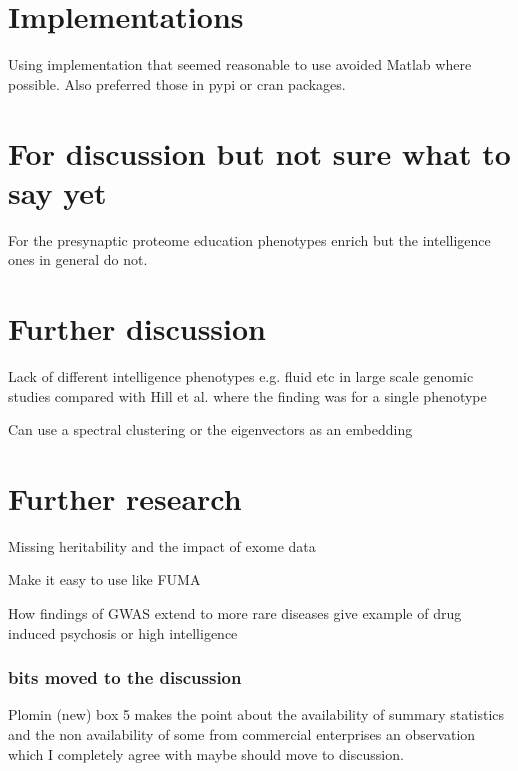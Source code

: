 \section{Implementations}

Using implementation that seemed reasonable to use avoided Matlab where possible. Also preferred those in pypi or cran packages. 


\section{For discussion but not sure what to say yet}

For the presynaptic proteome education phenotypes enrich but the intelligence ones in general do not. 

\section{Further discussion}
Lack of different intelligence phenotypes e.g. fluid etc in large scale genomic studies compared with Hill et al. where the finding was for a single phenotype

Can use a spectral clustering or the eigenvectors as an embedding
\section{Further research}
Missing heritability and the impact of exome data

Make it easy to use like FUMA

How findings of GWAS extend to more rare diseases give example of drug induced psychosis or high intelligence

\subsubsection{bits moved to the discussion}
Plomin (new) \cite{plomin2018new} box 5 makes the point about the availability of summary statistics and the non availability of some from commercial enterprises an observation which I completely agree with maybe should move to discussion.
